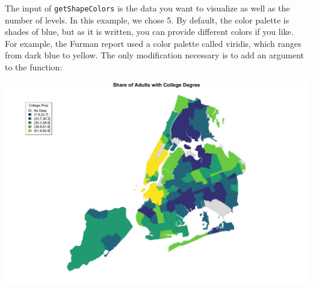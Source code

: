 \documentclass[
  openany]{book}
\newenvironment{Shaded}{\begin{snugshade}}{\end{snugshade}}
\newcommand{\AttributeTok}[1]{\textcolor[rgb]{0.77,0.63,0.00}{#1}}
\newcommand{\DecValTok}[1]{\textcolor[rgb]{0.00,0.00,0.81}{#1}}
\newcommand{\FloatTok}[1]{\textcolor[rgb]{0.00,0.00,0.81}{#1}}
\newcommand{\FunctionTok}[1]{\textcolor[rgb]{0.00,0.00,0.00}{#1}}
\newcommand{\NormalTok}[1]{#1}
\newcommand{\OtherTok}[1]{\textcolor[rgb]{0.56,0.35,0.01}{#1}}
\newcommand{\SpecialCharTok}[1]{\textcolor[rgb]{0.00,0.00,0.00}{#1}}
\newcommand{\StringTok}[1]{\textcolor[rgb]{0.31,0.60,0.02}{#1}}
\begin{document}
The input of \texttt{getShapeColors} is the data you want to visualize as well as the number of levels. In this example, we chose 5. By default, the color palette is shades of blue, but as it is written, you can provide different colors if you like. For example, the Furman report used a color palette called viridis, which ranges from dark blue to yellow. The only modification necessary is to add an argument to the function:

\begin{Shaded}
\end{Shaded}

\begin{center}\includegraphics[width=0.9\linewidth]{carpedatum_files/figure-html/unnamed-chunk-90-1} \end{center}
\end{document}
